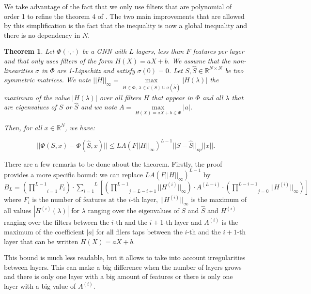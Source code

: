 \documentclass[11pt,a4paper]{article}
\newcommand{\op}[1]{|| #1 ||_{op}}
\newcommand{\ninf}[1]{|| #1 ||_\infty}
\newcommand{\Sum}[2]{\overset{#2}{\underset{#1}{\sum}}}
\newtheorem{theorem}{Theorem}
\theoremstyle{definition}
\renewcommand{\leq}{\leqslant}
\begin{document}
    We take advantage of the fact that we only use filters that are polynomial of order 1 to refine the theorem 4 of \cite{gama2020stability}. The two main improvements that are allowed by this simplification is the fact that the inequality is now a global inequality and there is no dependency in $N$.

    \begin{theorem}
    \label{thm:stability_general}
            Let $\Phi (\cdot , \cdot)$ be a GNN with $L$ layers, less than $F$ features per layer and that only uses filters of the form $H(X) = aX + b$. We assume that the non-linearities $\sigma$ in $\Phi$ are 1-Lipschitz and satisfy $\sigma(0)=0$. Let $S, \hat{S} \in \mathbb{R}^{N \times N}$ be two symmetric matrices. We note $\ninf{H} = \underset{H \in \Phi, \ \lambda \in \sigma(S) \cup \sigma(\hat{S})}{\max} |H(\lambda)|$ the maximum of the value $|H(\lambda)|$ over all filters $H$ that appear in $\Phi$ and all $\lambda$ that are eigenvalues of $S$ or $\hat{S}$ and we note $A = \underset{H(X)=aX+b \in \Phi}{\max} |a|$.

            Then, for all $x \in \mathbb{R}^N$, we have:

                $$|| \Phi (S,x) - \Phi (\hat{S},x) || \leq L A (F \ninf{H} )^ {L-1} \op{S - \hat{S}} ||x||.$$

        \end{theorem}


        There are a few remarks to be done about the theorem. Firstly, the proof provides a more specific bound: we can replace  $L A (F \ninf{H} )^ {L-1}$ by $B_L = \left( \underset{i=1}{\overset{L-1}{\prod}} F_i \right)  \cdot \Sum{i=1}{L} \left[ (\underset{j=L-i+1}{\overset{L-1}{\prod}} \ninf{H ^{(i)}}) \cdot A^{(L-i)} \cdot (\underset{j=0}{\overset{L-i-1}{\prod}} \ninf{H ^{(i)}}) \right] $ where $F_i$ is the number of features at the $i$-th layer, $\ninf{H^{(i)}}$ is the maximum of all values $|H^{(i)}(\lambda)|$ for $\lambda$ ranging over the eigenvalues of $S$ and $\hat{S}$ and $H^{(i)}$ ranging over the filters between the $i$-th and the $i+1$-th layer and $A^{(i)}$ is the maximum of the coefficient $|a|$ for all filers taps between the $i$-th and the $i+1$-th layer that can be written $H(X)=aX+b$.

        This bound is much less readable, but it allows to take into account irregularities between layers. This can make a big difference when the number of layers grows and there is only one layer with a big amount of features or there is only one layer with a big value of $A^{(i)}$.
\end{document}
